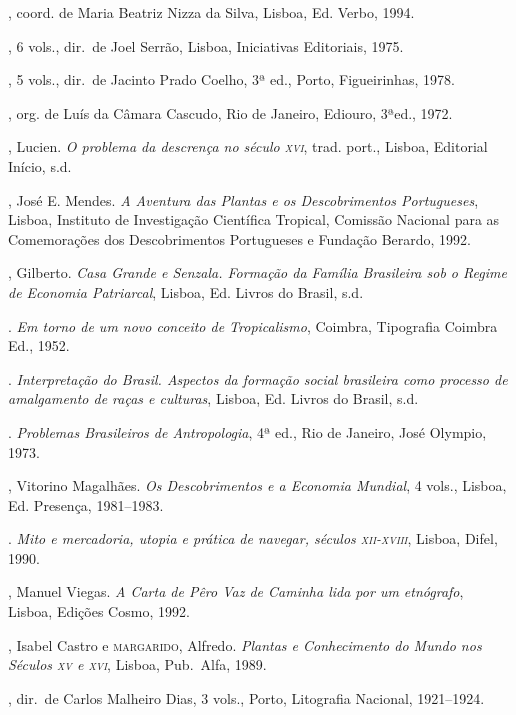 \begin{bibliohedra}
, 
coord. de Maria Beatriz Nizza da Silva, Lisboa, Ed. Verbo, 1994.

, 6 vols., dir.~de Joel
Serrão, Lisboa, Iniciativas Editoriais, 1975.

, 5 vols., dir.~de Jacinto
Prado Coelho, 3ª ed., Porto, Figueirinhas, 1978.

, org. de Luís da Câmara
Cascudo, Rio de Janeiro, Ediouro, 3ªed., 1972. 

, Lucien. \textit{O problema da descrença no século \textsc{xvi}}, trad.
port., Lisboa, Editorial Início, s.d. 

, José E. Mendes. \textit{A Aventura das Plantas e os
Descobrimentos Portugueses}, Lisboa, Instituto de Investigação
Científica Tropical, Comissão Nacional para as Comemorações dos
Descobrimentos Portugueses e Fundação Berardo, 1992.

, Gilberto. \textit{Casa Grande e Senzala. Formação da Família
Brasileira sob o Regime de Economia Patriarcal}, Lisboa, Ed. Livros do
Brasil, s.d.

\titidem. \textit{Em torno de um novo conceito de
Tropicalismo}, Coimbra, Tipografia Coimbra Ed., 1952.

\titidem. \textit{Interpretação do Brasil. Aspectos da
formação social brasileira como processo de amalgamento de raças e
culturas}, Lisboa, Ed. Livros do Brasil, s.d.

\titidem. \textit{Problemas Brasileiros de Antropologia}, 4ª
ed., Rio de Janeiro, José Olympio, 1973.

, Vitorino Magalhães. \textit{Os Descobrimentos e a Economia
Mundial}, 4 vols., Lisboa, Ed. Presença, 1981--1983.

\titidem. \textit{Mito e mercadoria, utopia e
prática de navegar, séculos \textsc{xii}-\textsc{xviii}}, Lisboa, Difel, 1990.

, Manuel Viegas. \textit{A Carta de Pêro Vaz de Caminha lida
por um etnógrafo}, Lisboa, Edições Cosmo, 1992.

, Isabel Castro e \textsc{margarido}, Alfredo. \textit{Plantas e
Conhecimento do Mundo nos Séculos \textsc{xv} e \textsc{xvi}}, Lisboa, Pub.~Alfa, 1989.

, dir.~de Carlos
Malheiro Dias, 3 vols., Porto, Litografia Nacional, 1921--1924.


\end{bibliohedra}
